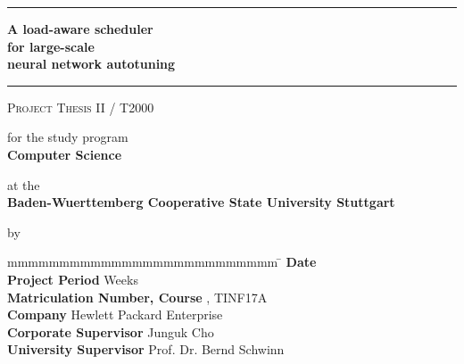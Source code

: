 \hfill
{}

\vfill
\begin{center}
	\rule{\textwidth}{1pt}
	{
		\Huge
		\bfseries
		A load-aware scheduler \\ for large-scale \\ neural network autotuning
		\par
	}
	\vspace{-0.2cm} 
	\rule{\textwidth}{1pt}

	\vfill

	\textsc{Project Thesis II / T2000}
	
	\vfill

	for the study program \\ \textbf{Computer Science}
	
	at the \\ \textbf{Baden-Wuerttemberg Cooperative State University Stuttgart}
	
	by \\ \textbf{\@author}
\end{center}

\vfill

\begin{tabbing}
	mmmmmmmmmmmmmmmmmmmmmmmmmm				\= \kill
	\textbf{Date}      						\> \@date \\
	\textbf{Project Period} 				 Weeks \\
	\textbf{Matriculation Number, Course}  	, TINF17A \\
	\textbf{Company}                        \> Hewlett Packard Enterprise \\
	\textbf{Corporate Supervisor}           \> Junguk Cho \\
	\textbf{University Supervisor}          \> Prof. Dr. Bernd Schwinn
\end{tabbing}
